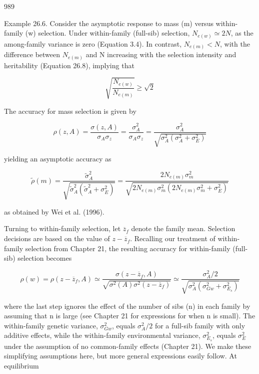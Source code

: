 \documentclass{article}
\begin{document}
{989

Example 26.6. Consider the asymptotic response to mass (m) versus within-family (w) selection. Under within-family (full-sib) selection,  $ N_{e(w)} \simeq 2N $, as the among-family variance is zero (Equation 3.4). In contrast,  $ N_{e(m)} < N $, with the difference between  $ N_{e(m)} $ and N increasing with the selection intensity and heritability (Equation 26.8), implying that

\begin{equation}
\sqrt{\frac{N_{e(w)}}{N_{e(m)}}}\geq\sqrt{2}
\tag{29.39a}
\label{eq:29_39a}
\end{equation}

The accuracy for mass selection is given by

\begin{equation}
\rho(z,A)=\frac{\sigma(z,A)}{\sigma_{A}\sigma_{z}}=\frac{\sigma_{A}^{2}}{\sigma_{A}\sigma_{z}}=\frac{\sigma_{A}^{2}}{\sqrt{\sigma_{A}^{2}\left(\sigma_{A}^{2}+\sigma_{E}^{2}\right)}}
\tag{29.39b}
\label{eq:29_39b}
\end{equation}

yielding an asymptotic accuracy as

\begin{equation}
\widetilde{\rho}(m)=\frac{\widetilde{\sigma}_{A}^{2}}{\sqrt{\widetilde{\sigma}_{A}^{2}(\widetilde{\sigma}_{A}^{2}+\sigma_{E}^{2})}}=\frac{2N_{e(m)}\sigma_{m}^{2}}{\sqrt{2N_{e(m)}\sigma_{m}^{2}(2N_{e(m)}\sigma_{m}^{2}+\sigma_{E}^{2})}}
\tag{29.39c}
\label{eq:29_39c}
\end{equation}

as obtained by Wei et al. (1996).

Turning to within-family selection, let  $ \overline{z}_{f} $ denote the family mean. Selection decisions are based on the value of  $ z - \overline{z}_{f} $. Recalling our treatment of within-family selection from Chapter 21, the resulting accuracy for within-family (full-sib) selection becomes

\begin{equation}
\rho(w)=\rho(z-\overline{z}_{f},A)\simeq\frac{\sigma(z-\overline{z}_{f},A)}{\sqrt{\sigma^{2}(A)\sigma^{2}(z-\overline{z}_{f})}}\simeq\frac{\sigma_{A}^{2}/2}{\sqrt{\sigma_{A}^{2}(\sigma_{G w}^{2}+\sigma_{E_{s}}^{2})}}
\tag{29.39d}
\label{eq:29_39d}
\end{equation}

where the last step ignores the effect of the number of sibs (n) in each family by assuming that n is large (see Chapter 21 for expressions for when n is small). The within-family genetic variance,  $ \sigma_{Gw}^{2} $, equals  $ \sigma_{A}^{2}/2 $ for a full-sib family with only additive effects, while the within-family environmental variance,  $ \sigma_{E_{s}}^{2} $, equals  $ \sigma_{E}^{2} $ under the assumption of no common-family effects (Chapter 21). We make these simplifying assumptions here, but more general expressions easily follow. At equilibrium

}
\end{document}
